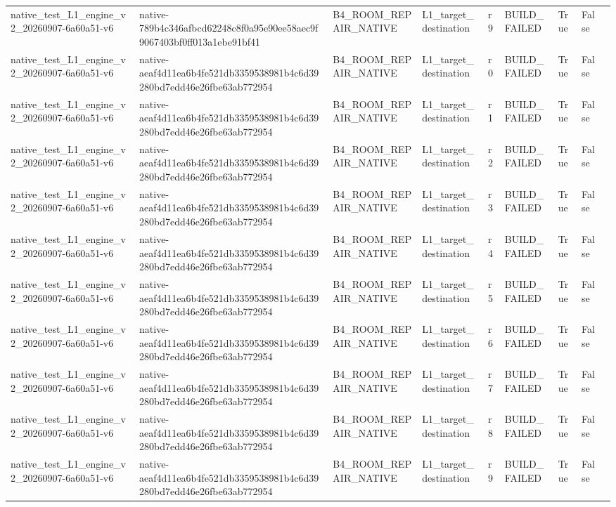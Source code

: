 \begin{tabular}{lllllllll}
native\_test\_L1\_engine\_v2\_20260907-6a60a51-v6 & native-789b4c346afbcd62248c8f0a95e90ee58aec9f9067403bf0ff013a1ebe91bf41 & B4\_ROOM\_REPAIR\_NATIVE & L1\_target\_destination & r9 & BUILD\_FAILED & True & False &  \\
native\_test\_L1\_engine\_v2\_20260907-6a60a51-v6 & native-aeaf4d11ea6b4fe521db3359538981b4c6d39280bd7edd46e26fbe63ab772954 & B4\_ROOM\_REPAIR\_NATIVE & L1\_target\_destination & r0 & BUILD\_FAILED & True & False &  \\
native\_test\_L1\_engine\_v2\_20260907-6a60a51-v6 & native-aeaf4d11ea6b4fe521db3359538981b4c6d39280bd7edd46e26fbe63ab772954 & B4\_ROOM\_REPAIR\_NATIVE & L1\_target\_destination & r1 & BUILD\_FAILED & True & False &  \\
native\_test\_L1\_engine\_v2\_20260907-6a60a51-v6 & native-aeaf4d11ea6b4fe521db3359538981b4c6d39280bd7edd46e26fbe63ab772954 & B4\_ROOM\_REPAIR\_NATIVE & L1\_target\_destination & r2 & BUILD\_FAILED & True & False &  \\
native\_test\_L1\_engine\_v2\_20260907-6a60a51-v6 & native-aeaf4d11ea6b4fe521db3359538981b4c6d39280bd7edd46e26fbe63ab772954 & B4\_ROOM\_REPAIR\_NATIVE & L1\_target\_destination & r3 & BUILD\_FAILED & True & False &  \\
native\_test\_L1\_engine\_v2\_20260907-6a60a51-v6 & native-aeaf4d11ea6b4fe521db3359538981b4c6d39280bd7edd46e26fbe63ab772954 & B4\_ROOM\_REPAIR\_NATIVE & L1\_target\_destination & r4 & BUILD\_FAILED & True & False &  \\
native\_test\_L1\_engine\_v2\_20260907-6a60a51-v6 & native-aeaf4d11ea6b4fe521db3359538981b4c6d39280bd7edd46e26fbe63ab772954 & B4\_ROOM\_REPAIR\_NATIVE & L1\_target\_destination & r5 & BUILD\_FAILED & True & False &  \\
native\_test\_L1\_engine\_v2\_20260907-6a60a51-v6 & native-aeaf4d11ea6b4fe521db3359538981b4c6d39280bd7edd46e26fbe63ab772954 & B4\_ROOM\_REPAIR\_NATIVE & L1\_target\_destination & r6 & BUILD\_FAILED & True & False &  \\
native\_test\_L1\_engine\_v2\_20260907-6a60a51-v6 & native-aeaf4d11ea6b4fe521db3359538981b4c6d39280bd7edd46e26fbe63ab772954 & B4\_ROOM\_REPAIR\_NATIVE & L1\_target\_destination & r7 & BUILD\_FAILED & True & False &  \\
native\_test\_L1\_engine\_v2\_20260907-6a60a51-v6 & native-aeaf4d11ea6b4fe521db3359538981b4c6d39280bd7edd46e26fbe63ab772954 & B4\_ROOM\_REPAIR\_NATIVE & L1\_target\_destination & r8 & BUILD\_FAILED & True & False &  \\
native\_test\_L1\_engine\_v2\_20260907-6a60a51-v6 & native-aeaf4d11ea6b4fe521db3359538981b4c6d39280bd7edd46e26fbe63ab772954 & B4\_ROOM\_REPAIR\_NATIVE & L1\_target\_destination & r9 & BUILD\_FAILED & True & False &  \\

\end{tabular}
